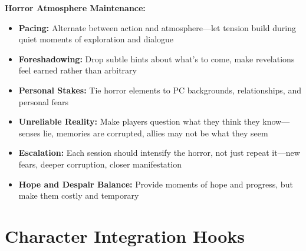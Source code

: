 \documentclass[11pt]{article}
\begin{document}
\textbf{Horror Atmosphere Maintenance:}
\begin{itemize}
\item \textbf{Pacing:} Alternate between action and atmosphere—let tension build during quiet moments of exploration and dialogue
\item \textbf{Foreshadowing:} Drop subtle hints about what's to come, make revelations feel earned rather than arbitrary
\item \textbf{Personal Stakes:} Tie horror elements to PC backgrounds, relationships, and personal fears
\item \textbf{Unreliable Reality:} Make players question what they think they know—senses lie, memories are corrupted, allies may not be what they seem
\item \textbf{Escalation:} Each session should intensify the horror, not just repeat it—new fears, deeper corruption, closer manifestation
\item \textbf{Hope and Despair Balance:} Provide moments of hope and progress, but make them costly and temporary
\end{itemize}

\section{Character Integration Hooks}
\end{document}
